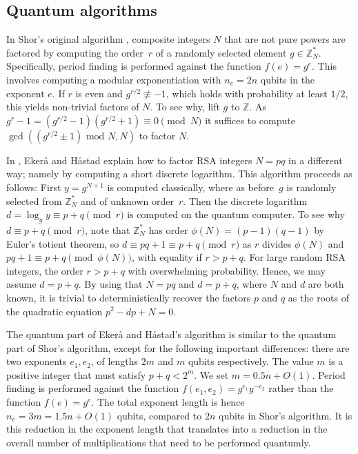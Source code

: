 \documentclass[superscriptaddress,notitlepage,longbibliography]{revtex4-1}
\theoremstyle{definition}
\theoremstyle{definition}
\newcommand{\lenexp}{{n_e}}
\newcommand{\gen}{g}
\begin{document}
\subsection{Quantum algorithms}

In Shor's original algorithm \cite{shor1994}, composite integers $N$ that are not pure powers are factored by computing the order~$r$ of a randomly selected element $\gen \in \mathbb Z_N^*$.
Specifically, period finding is performed against the function $f(e) = \gen^e$.
This involves computing a modular exponentiation with $\lenexp=2n$ qubits in the exponent $e$.
If $r$ is even and $\gen^{r/2} \not\equiv -1$, which holds with probability at least $1/2$, this yields non-trivial factors of $N$.
To see why, lift $\gen$ to $\mathbb Z$.
As $\gen^r - 1 = (\gen^{r/2} - 1)(\gen^{r/2} + 1)
\equiv 0 \pmod{N}$ it suffices to compute $\gcd((\gen^{r/2} \pm 1) \text{ mod } N, N)$ to factor $N$.

In \cite{ekeraa2016modifying,ekeraa2017quantum,ekeraa2017pp}, Ekerå and Håstad explain how to factor RSA integers $N = pq$ in a different way; namely by computing a short discrete logarithm.
This algorithm proceeds as follows:
First $y = \gen^{N+1}$ is computed classically, where as before~$\gen$ is randomly selected from $\mathbb Z_N^*$ and of unknown order~$r$.
Then the discrete logarithm $d = \log_{\gen} y \equiv p + q \pmod{r}$ is computed on the quantum computer.
To see why $d \equiv p + q \pmod{r}$, note that $\mathbb Z_N^*$ has order $\phi(N) = (p-1)(q-1)$ by Euler's totient theorem, so $d \equiv pq + 1 \equiv p + q \pmod{r}$ as $r$ divides $\phi(N)$ and $pq + 1 \equiv p + q \pmod{\phi(N)}$, with equality if $r > p + q$.
For large random RSA integers, the order $r > p + q$ with overwhelming probability.
Hence, we may assume $d = p + q$.
By using that $N = pq$ and $d=p+q$, where $N$ and $d$ are both known, it is trivial to deterministically recover the factors $p$ and $q$ as the roots of the quadratic equation $p^2 - dp + N = 0$.

The quantum part of Ekerå and Håstad's algorithm is similar to the quantum part of Shor's algorithm, except for the following important differences:
there are two exponents $e_1, e_2$, of lengths $2m$ and $m$ qubits respectively.
The value $m$ is a positive integer that must satisfy $p + q < 2^m$.
We set $m = 0.5n + O(1)$.
Period finding is performed against the function $f(e_1, e_2) = \gen^{e_1} y^{-e_2}$ rather than the function $f(e)=\gen^e$.
The total exponent length is hence $n_e = 3m = 1.5n + O(1)$ qubits, compared to $2n$ qubits in Shor's algorithm.
It is this reduction in the exponent length that translates into a reduction in the overall number of multiplications that need to be performed quantumly.
\end{document}
